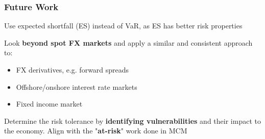 \documentclass{beamer}
\newenvironment{largeenumerate}{\enumerate\addtolength{\itemsep}{10pt}}{\endenumerate}
\begin{document}
\begin{frame}
  \frametitle{Future Work}
  \begin{largeenumerate}
    \item Use expected shortfall (ES) instead of VaR, as ES has better risk properties
    
    \item Look \textbf{beyond spot FX markets} and apply a similar and consistent
      approach to:
      \begin{itemize}
      \item FX derivatives, e.g. forward spreads
      \item Offshore/onshore interest
        rate markets
      \item Fixed income market 
      \end{itemize}
   \item Determine the risk tolerance by \textbf{identifying vulnerabilities} and their
     impact to the economy. Align with the "\textbf{at-risk}" work done in MCM
  \end{largeenumerate}
\end{frame}




\end{document}
